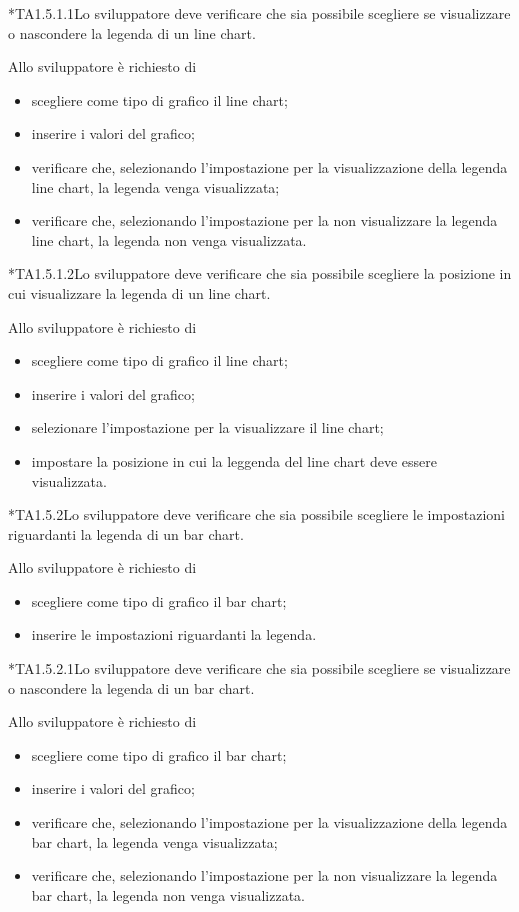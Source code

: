 	*{TA1.5.1.1}Lo sviluppatore deve verificare che sia possibile scegliere se visualizzare o nascondere la legenda di un line chart.
			
		Allo sviluppatore è richiesto di
		\begin{itemize}
			\item scegliere come tipo di grafico il line chart;
			\item inserire i valori del grafico;
			\item verificare che, selezionando l'impostazione per la visualizzazione della legenda line chart, la legenda venga visualizzata;
			\item verificare che, selezionando l'impostazione per la non visualizzare la legenda line chart, la legenda non venga visualizzata.
		\end{itemize}

	*{TA1.5.1.2}Lo sviluppatore deve verificare che sia possibile scegliere la posizione in cui visualizzare la legenda di un line chart.
			
		Allo sviluppatore è richiesto di
		\begin{itemize}
			\item scegliere come tipo di grafico il line chart;
			\item inserire i valori del grafico;
			\item selezionare l'impostazione per la visualizzare il line chart;
			\item impostare la posizione in cui la leggenda del line chart deve essere visualizzata.

		\end{itemize}

	*{TA1.5.2}Lo sviluppatore deve verificare che sia possibile scegliere le impostazioni riguardanti la legenda di un bar chart.

		Allo sviluppatore è richiesto di
		\begin{itemize}
			\item scegliere come tipo di grafico il bar chart;
			\item inserire le impostazioni riguardanti la legenda.
		\end{itemize}

	*{TA1.5.2.1}Lo sviluppatore deve verificare che sia possibile scegliere se visualizzare o nascondere la legenda di un bar chart.
		
		Allo sviluppatore è richiesto di
		\begin{itemize}
			\item scegliere come tipo di grafico il bar chart;
			\item inserire i valori del grafico;
			\item verificare che, selezionando l'impostazione per la visualizzazione della legenda bar chart, la legenda venga visualizzata;
			\item verificare che, selezionando l'impostazione per la non visualizzare la legenda bar chart, la legenda non venga visualizzata.
		\end{itemize}

